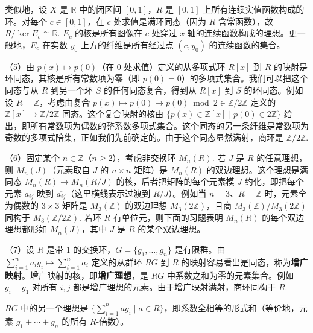 \begin{example}
类似地，设 \(X\) 是 \(\mathbb{R}\) 中的闭区间 \([0,1]\)，\(R\) 是 \([0,1]\) 上所有连续实值函数构成的环。对每个 \(c \in [0,1]\)，在 \(c\) 处求值是满环同态（因为 \(R\) 含常函数），故 \(R/\ker E_c \cong \mathbb{R}\). \(E_c\) 的核是所有图像在 \(c\) 处穿过 \(x\) 轴的连续函数构成的理想。更一般地，\(E_c\) 在实数 \(y_0\) 上方的纤维是所有经过点 \((c, y_0)\) 的连续函数的集合。

（5）由 \(p(x) \mapsto p(0)\)（在 0 处求值）定义的从多项式环 \(R[x]\) 到 \(R\) 的映射是环同态，其核是所有常数项为零（即 \(p(0) = 0\)）的多项式集合。我们可以把这个同态与从 \(R\) 到另一个环 \(S\) 的任何同态复合，得到从 \(R[x]\) 到 \(S\) 的环同态。例如设 \(R = \mathbb{Z}\)，考虑由复合 \(p(x) \mapsto p(0) \mapsto p(0) \bmod 2 \in \mathbb{Z}/2\mathbb{Z}\) 定义的 \(\mathbb{Z}[x] \to \mathbb{Z}/2\mathbb{Z}\) 同态。这个复合映射的核由 \(\{p(x) \in \mathbb{Z}[x] \mid p(0) \in 2\mathbb{Z}\}\) 给出，即所有常数项为偶数的整系数多项式集合。这个同态的另一条纤维是常数项为奇数的多项式陪集，正如我们先前确定的。由于这个同态显然满射，商环是 \(\mathbb{Z}/2\mathbb{Z}\).

（6）固定某个 \(n \in \mathbb{Z}\)（\(n \geq 2\)），考虑非交换环 \(M_n(R)\). 若 \(J\) 是 \(R\) 的任意理想，则 \(M_n(J)\)（元素取自 \(J\) 的 \(n \times n\) 矩阵）是 \(M_n(R)\) 的双边理想。这个理想是满同态 \(M_n(R) \to M_n(R/J)\) 的核，后者把矩阵的每个元素模 \(J\) 约化，即把每个元素 \(a_{ij}\) 映到 \(\overline{a_{ij}}\)（这里横线表示过渡到 \(R/J\)）。例如当 \(n = 3\)、\(R = \mathbb{Z}\) 时，元素全为偶数的 \(3 \times 3\) 矩阵是 \(M_3(\mathbb{Z})\) 的双边理想 \(M_3(2\mathbb{Z})\)，且商 \(M_3(\mathbb{Z})/M_3(2\mathbb{Z})\) 同构于 \(M_3(\mathbb{Z}/2\mathbb{Z})\). 若环 \(R\) 有单位元，则下面的习题表明 \(M_n(R)\) 的每个双边理想都形如 \(M_n(J)\)，其中 \(J\) 是 \(R\) 的某个双边理想。

（7）设 \(R\) 是带 1 的交换环，\(G = \{g_1, \ldots, g_n\}\) 是有限群。由 \(\sum_{i=1}^{n} a_ig_i \mapsto \sum_{i=1}^{n} a_i\) 定义的从群环 \(RG\) 到 \(R\) 的映射容易看出是同态，称为\textbf{增广映射}。增广映射的核，即\textbf{增广理想}，是 \(RG\) 中系数之和为零的元素集合。例如 \(g_i - g_1\) 对所有 \(i, j\) 都是增广理想的元素。由于增广映射满射，商环同构于 \(R\).

\(RG\) 中的另一个理想是 \(\{\sum_{i=1}^{n} ag_i \mid a \in R\}\)，即系数全相等的形式和（等价地，元素 \(g_1 + \cdots + g_n\) 的所有 \(R\)-倍数）。


\end{example}
